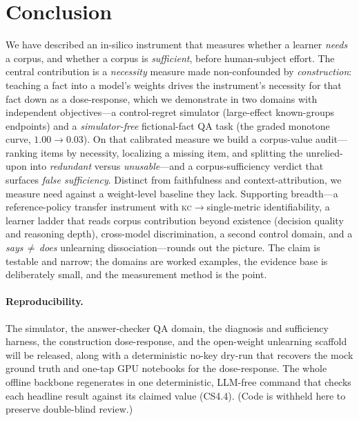 \documentclass{article}
\newcommand{\kc}{\textsc{kc}}
\begin{document}
\section{Conclusion}
We have described an in-silico instrument that measures whether a learner \emph{needs} a corpus,
and whether a corpus is \emph{sufficient}, before human-subject effort. The central contribution
is a \emph{necessity} measure made non-confounded by \emph{construction}: teaching a fact into a
model's weights drives the instrument's necessity for that fact down as a dose-response, which we
demonstrate in two domains with independent objectives---a control-regret simulator (large-effect
known-groups endpoints) and a \emph{simulator-free} fictional-fact QA task (the graded monotone
curve, $1.00\!\to\!0.03$). On that calibrated measure we build a corpus-value audit---ranking
items by necessity, localizing a missing item, and splitting the unrelied-upon into
\emph{redundant} versus \emph{unusable}---and a corpus-sufficiency verdict that surfaces
\emph{false sufficiency}. Distinct from faithfulness and context-attribution, we measure need
against a weight-level baseline they lack. Supporting breadth---a reference-policy transfer
instrument with \kc$\to$single-metric identifiability, a learner ladder that reads corpus
contribution beyond existence (decision quality and reasoning depth), cross-model discrimination, a
second control domain, and a \emph{says\,$\neq$\,does} unlearning dissociation---rounds out the picture.
The claim is testable and narrow; the domains are worked examples, the evidence base is
deliberately small, and the measurement method is the point.

\paragraph{Reproducibility.} The simulator, the answer-checker QA domain, the diagnosis and
sufficiency harness, the construction dose-response, and the open-weight unlearning scaffold will
be released, along with a deterministic no-key dry-run that recovers the mock ground truth and
one-tap GPU notebooks for the dose-response. The whole offline backbone regenerates in one
deterministic, LLM-free command that checks each headline result against its claimed value (CS4.4).
(Code is withheld here to preserve double-blind review.)

\small


\end{document}
